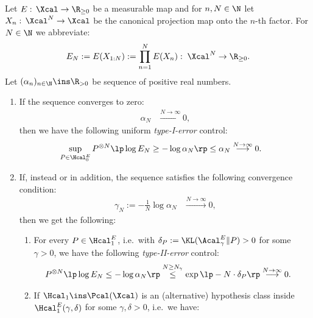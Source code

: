 \begin{Thm}
    \label{thm:e-variables-type-I-II-error}
    Let $E:\, \Xcal \to \R_{\ge0}$ be a measurable map and for $n, N \in \N$ let $X_n:\, \Xcal^N \to \Xcal$ be the canonical projection map onto the $n$-th factor.
     For $N \in \N$ we abbreviate: %
     \begin{align*} E_N:=E(X_{1:N}):=\prod_{n =1}^N E(X_n):\; \Xcal^N \to \R_{\ge 0}. \end{align*}
 Let $(\alpha_n)_{n \in \N} \ins \R_{>0}$ be sequence of positive real numbers.
 \begin{enumerate}
     \item  If the sequence converges to zero:
 \begin{align*} 
     \alpha_N &\stackrel{N \to \infty}{\longrightarrow} 0,
 \end{align*}
then we have the following uniform \emph{type-I-error} control:
 \begin{align*}
     \sup_{P \in \Hcal_0^E}  P^{\otimes N}\lp\log E_N \ge -\log\alpha_N \rp & \le \alpha_N \stackrel{N \to \infty}{\longrightarrow} 0.
 \end{align*}
\item If, instead or in addition, the sequence satisfies the following convergence condition:
 \begin{align*} 
     \gamma_N:=-\frac{1}{N} \log \alpha_N &\stackrel{N \to \infty}{\longrightarrow} 0, 
 \end{align*}
then we get the following:
\begin{enumerate}
 \item For every $P \in \Hcal_1^E$, i.e.\ with $\delta_P:=\KL(\Acal_\gamma^E\|P) >0$ for some $\gamma >0$,
 we have the following \emph{type-II-error} control:
 \begin{align*}
     P^{\otimes N}\lp \log E_N \le-\log\alpha_N \rp & \stackrel{N \ge N_\gamma}{\le} \exp\lp -N \cdot \delta_P \rp \stackrel{N \to \infty}{\longrightarrow} 0.
 \end{align*}
 \item If $\Hcal_1 \ins \Pcal(\Xcal)$ is an (alternative) hypothesis class inside $\Hcal_{1}^E(\gamma,\delta)$ for some $\gamma,\delta >0$, i.e.\ we have:
    \begin{align*}

\end{align*}
\end{enumerate}
\end{enumerate}
\end{Thm}
